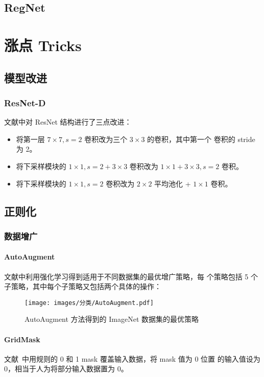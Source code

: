 \section{RegNet}

\chapter{涨点 Tricks}
\section{模型改进}
\subsection{ResNet-D}
文献中对 ResNet 结构进行了三点改进：
\begin{itemize}
  \item 将第一层 $7 \times 7, s=2$ 卷积改为三个 $3 \times 3$ 的卷积，其中第一个
    卷积的 stride 为 2。
  \item 将下采样模块的 $1 \times 1, s=2 + 3 \times 3$ 卷积改为 $1 \times 1 + 3
    \times 3, s=2$ 卷积。
  \item 将下采样模块的 $1 \times 1, s=2$ 卷积改为 $2 \times 2$ 平均池化 + $1
    \times 1$ 卷积。
\end{itemize}

\section{正则化}
\subsection{数据增广}
\subsubsection{AutoAugment}
文献中利用强化学习得到适用于不同数据集的最优增广策略，每
个策略包括 5 个子策略，其中每个子策略又包括两个具体的操作：

\begin{figure}[ht]
  \centering
  \texttt{[image: images/分类/AutoAugment.pdf]}
  \caption{AutoAugment 方法得到的 ImageNet 数据集的最优策略}\label{fig:autoaugment}
\end{figure}


\subsubsection{GridMask}
文献~中用规则的 0 和 1 mask 覆盖输入数据，将 mask 值为 0 位置
的输入值设为 0，相当于人为将部分输入数据置为 0。

